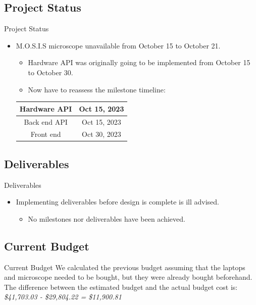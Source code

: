 \documentclass[17pt, aspectratio=169]{beamer}
\begin{document}
\subsection{Project Status}
\begin{frame}{Project Status}
	\begin{itemize}
		\item M.O.S.I.S microscope unavailable from October 15 to October 21.
		      \begin{itemize}
			      \item Hardware API was originally going to be implemented from October 15 to October 30.
			      \item Now have to reassess the milestone timeline:
		      \end{itemize}
		      \begin{center}
			      \begin{tabular}{||c | c||}
				      \hline
				      Hardware API & Oct 15, 2023 \\
				      \hline
				      Back end API & Oct 15, 2023 \\
				      \hline
				      Front end    & Oct 30, 2023 \\
				      \hline
			      \end{tabular}
		      \end{center}
	\end{itemize}
\end{frame}
\subsection{Deliverables}
\begin{frame}{Deliverables}
	\begin{itemize}
		\item Implementing deliverables before design is complete is ill advised.
		      \begin{itemize}
			      \item No milestones nor deliverables have been achieved.
		      \end{itemize}
	\end{itemize}
\end{frame}
\subsection{Current Budget}
\begin{frame}{Current Budget}
We calculated the previous budget assuming that the laptops and microscope needed to be bought, but they were already bought beforehand.
The difference between the estimated budget and the actual budget cost is:\\
\textit{\$41,703.03 - \$29,804.22 = \$11,900.81}\\
\end{frame}
\end{document}
